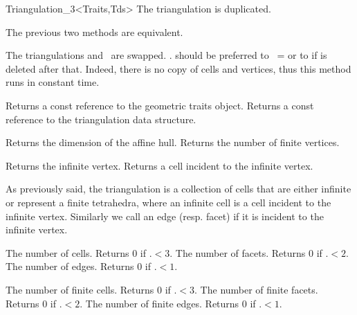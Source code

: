\begin{ccClassTemplate}{Triangulation_3<Traits,Tds>}
{The triangulation is duplicated.}

The previous two methods are equivalent.

{The triangulations  and \ccVar\ are swapped.
\ccVar. should be preferred to \ccVar\ =  or to
 if  is deleted after that. Indeed, there is no
copy of cells and vertices, thus this method runs in constant time.}

\ccAccessFunctions
{}

{Returns a const reference to the geometric traits object.}
\ccGlue
{}
{Returns a const reference to the triangulation data structure.}

{Returns the dimension of the affine hull.}
\ccGlue
{}
{Returns the number of finite vertices.}

{Returns the infinite vertex.}
\ccGlue
{}
{Returns a cell incident to the infinite vertex.}


As previously said, the triangulation is a collection of cells that
are either infinite or represent a finite tetrahedra, where an
infinite cell is a 
cell incident to the infinite vertex. Similarly we call
an edge (resp. facet)  if it is incident to the infinite vertex.

{The number of cells. Returns 0 if \ccVar.$<3$.}
\ccGlue
{}
{The number of facets. Returns 0 if \ccVar.$<2$.}
\ccGlue
{}
{The number of edges. Returns 0 if \ccVar.$<1$.}

{The number of finite cells. Returns 0 if \ccVar.$<3$.}
\ccGlue
{}
{The number of finite facets. Returns 0 if \ccVar.$<2$.}
\ccGlue
{}
{The number of finite edges. Returns 0 if \ccVar.$<1$.}


\end{ccClassTemplate}
